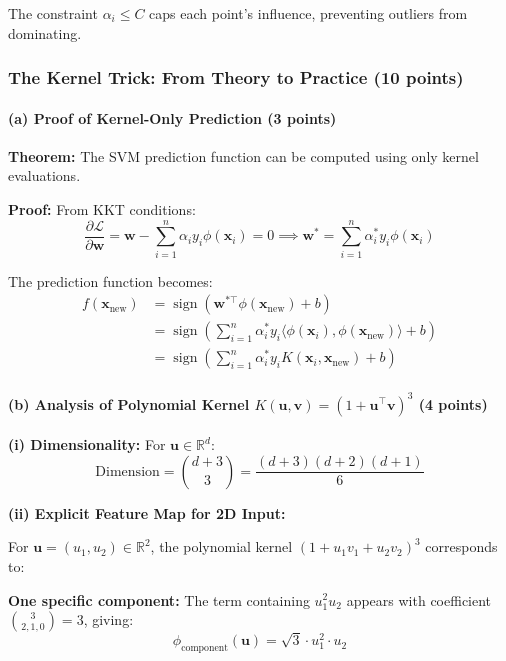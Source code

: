 \documentclass[12pt,a4paper]{article}
\newcommand{\R}{\mathbb{R}}
\newcommand{\sign}{\operatorname{sign}}
\theoremstyle{definition}
\begin{document}
The constraint $\alpha_i \leq C$ caps each point's influence, preventing outliers from dominating.

\subsubsection{The Kernel Trick: From Theory to Practice (10 points)}

\paragraph{(a) Proof of Kernel-Only Prediction (3 points)}

\textbf{Theorem:} The SVM prediction function can be computed using only kernel evaluations.

\textbf{Proof:} From KKT conditions:
\begin{equation}
\frac{\partial \mathcal{L}}{\partial \mathbf{w}} = \mathbf{w} - \sum_{i=1}^n \alpha_i y_i \phi(\mathbf{x}_i) = 0 \implies \mathbf{w}^* = \sum_{i=1}^n \alpha_i^* y_i \phi(\mathbf{x}_i)
\end{equation}

The prediction function becomes:
\begin{align}
f(\mathbf{x}_{\text{new}}) &= \sign\left(\mathbf{w}^{*\top} \phi(\mathbf{x}_{\text{new}}) + b\right)\\
&= \sign\left(\sum_{i=1}^n \alpha_i^* y_i \langle\phi(\mathbf{x}_i), \phi(\mathbf{x}_{\text{new}})\rangle + b\right)\\
&= \boxed{\sign\left(\sum_{i=1}^n \alpha_i^* y_i K(\mathbf{x}_i, \mathbf{x}_{\text{new}}) + b\right)}
\end{align}

\paragraph{(b) Analysis of Polynomial Kernel $K(\mathbf{u}, \mathbf{v}) = (1 + \mathbf{u}^\top\mathbf{v})^3$ (4 points)}

\textbf{(i) Dimensionality:} For $\mathbf{u} \in \R^d$:
\begin{equation}
\boxed{\text{Dimension} = \binom{d+3}{3} = \frac{(d+3)(d+2)(d+1)}{6}}
\end{equation}

\textbf{(ii) Explicit Feature Map for 2D Input:}

For $\mathbf{u} = (u_1, u_2) \in \R^2$, the polynomial kernel $(1 + u_1v_1 + u_2v_2)^3$ corresponds to:

\textbf{One specific component:} The term containing $u_1^2 u_2$ appears with coefficient $\binom{3}{2,1,0} = 3$, giving:
\begin{equation}
\boxed{\phi_{\text{component}}(\mathbf{u}) = \sqrt{3} \cdot u_1^2 \cdot u_2}
\end{equation}
\end{document}
